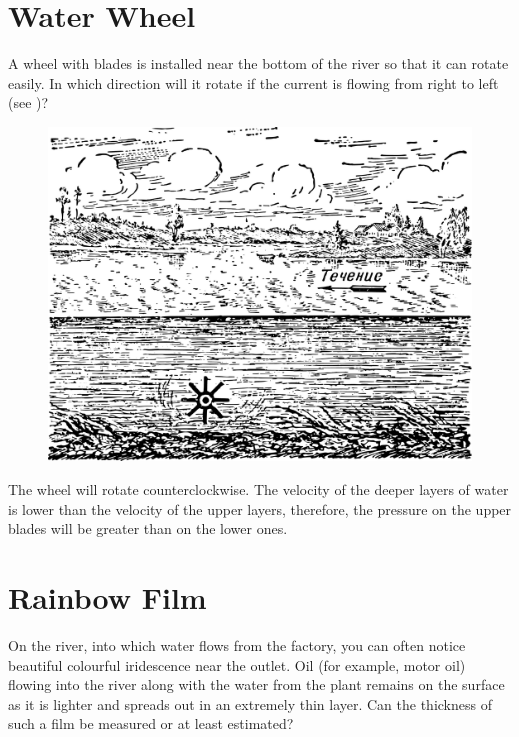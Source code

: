 \section{Water Wheel}
\label{sec-2.09}

\ques A wheel with blades is installed near the bottom of the river so that it can rotate easily. In which direction will it rotate if the current is flowing from right to left (see )?

\begin{figure}[h!]
\centering
\includegraphics[width=\textwidth]{figures/ch-02/fig-045.pdf}
\end{figure}

\ans The wheel will rotate counterclockwise. The velocity of the deeper layers of water is lower than the velocity of the upper layers, therefore, the pressure on the upper blades will be greater than on the lower ones.


\section{Rainbow Film}
\label{sec-2.10}
On the river, into which water flows from the factory, you can often notice beautiful colourful iridescence near the outlet. Oil (for example, motor oil) flowing into the river along with the water from the plant remains on the surface as it is lighter and spreads out in an extremely thin layer. Can the thickness of such a film be measured or at least estimated?

